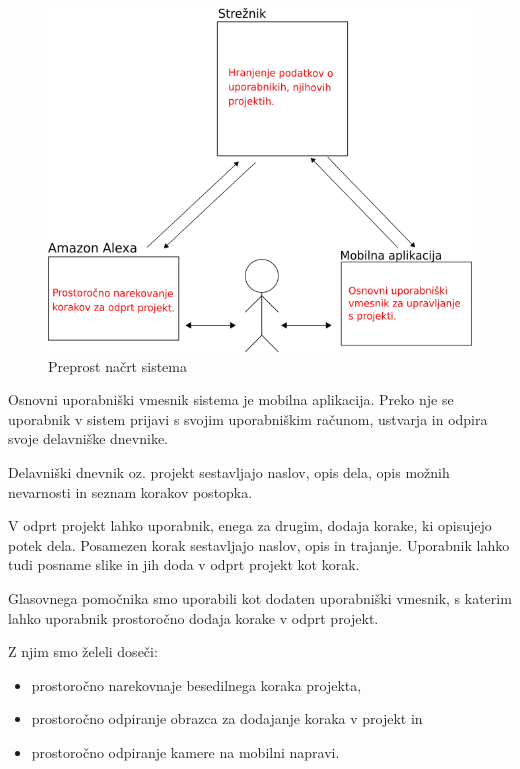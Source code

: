\documentclass[a4paper, 12pt]{book}
\begin{document}
\begin{figure}[H]
\begin{center}
\includegraphics[width=13cm]{plan_simple}
\end{center}
\caption{Preprost načrt sistema}
\label{plan_simple}
\end{figure}


Osnovni uporabniški vmesnik sistema je mobilna aplikacija.
Preko nje se uporabnik v sistem prijavi s svojim uporabniškim računom, ustvarja in odpira svoje delavniške dnevnike.

Delavniški dnevnik oz. projekt sestavljajo naslov, opis dela, opis možnih nevarnosti in seznam korakov postopka.

V odprt projekt lahko uporabnik, enega za drugim, dodaja korake, ki opisujejo potek dela.
Posamezen korak sestavljajo naslov, opis in trajanje.
Uporabnik lahko tudi posname slike in jih doda v odprt projekt kot korak.

Glasovnega pomočnika smo uporabili kot dodaten uporabniški vmesnik, s katerim lahko uporabnik prostoročno dodaja korake v odprt projekt.

\noindent Z njim smo želeli doseči:
\begin{itemize}
	\item prostoročno narekovnaje besedilnega koraka projekta,
	\item prostoročno odpiranje obrazca za dodajanje koraka v projekt in
	\item prostoročno odpiranje kamere na mobilni napravi.
\end{itemize}
\end{document}
